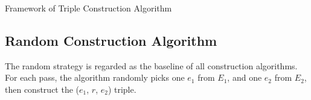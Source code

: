 

\begin{algorithm}%
  \small
  \caption{Framework of Triple Construction Algorithm}
  \label{algo:construct}
    
  
    \BlankLine
\end{algorithm}



\subsection*{Random Construction Algorithm}
The random strategy is regarded as the baseline of all construction algorithms.
For each pass, the algorithm randomly picks one $e_1$ from $E_1$, and one $e_2$ from $E_2$,
then construct the ($e_1$, $r$, $e_2$) triple.



%    
%  



